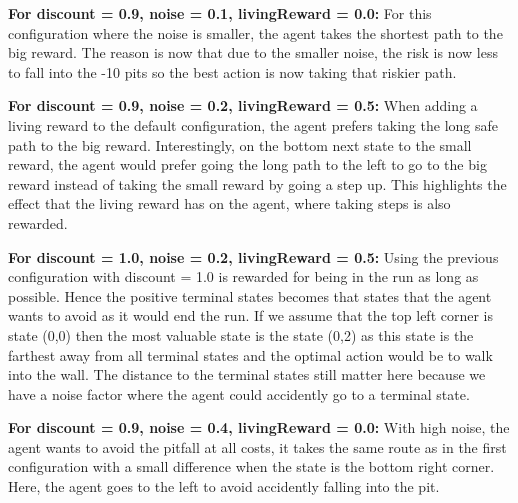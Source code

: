 \documentclass[11pt]{article}
\begin{document}
\noindent 
\textbf{For discount = 0.9, noise = 0.1, livingReward = 0.0:} For this configuration where the noise is smaller, the agent takes the shortest path to the big reward. The reason is now that due to the smaller noise, the risk is now less to fall into the -10 pits so the best action is now taking that riskier path.

\noindent
\textbf{For discount = 0.9, noise = 0.2, livingReward = 0.5:} When adding a living reward to the default configuration, the agent prefers taking the long safe path to the big reward. Interestingly, on the bottom next state to the small reward, the agent would prefer going the long path to the left to go to the big reward instead of taking the small reward by going a step up. This highlights the effect that the living reward has on the agent, where taking steps is also rewarded.

\noindent
\textbf{For discount = 1.0, noise = 0.2, livingReward = 0.5:} Using the previous configuration with discount = 1.0 is rewarded for being in the run as long as possible. Hence the positive terminal states becomes that states that the agent wants to avoid as it would end the run. If we assume that the top left corner is state (0,0) then the most valuable state is the state (0,2) as this state is the farthest away from all terminal states and the optimal action would be to walk into the wall. The distance to the terminal states still matter here because we have a noise factor where the agent could accidently go to a terminal state.

\noindent
\textbf{For discount = 0.9, noise = 0.4, livingReward = 0.0:} With high noise, the agent wants to avoid the pitfall at all costs, it takes the same route as in the first configuration with a small difference when the state is the bottom right corner. Here, the agent goes to the left to avoid accidently falling into the pit.
\end{document}

